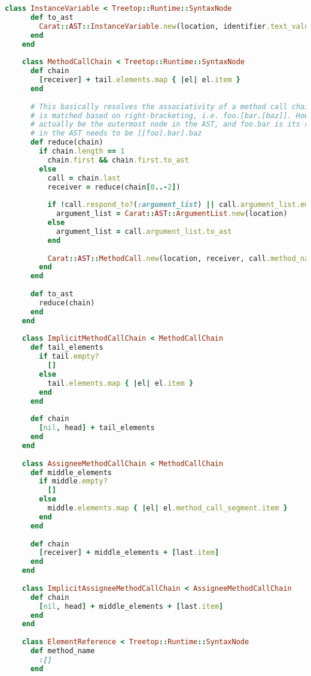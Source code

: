 \begin{lstlisting}[title={\small\Helvetica parser/nodes.rb},language=Ruby]
    class InstanceVariable < Treetop::Runtime::SyntaxNode
      def to_ast
        Carat::AST::InstanceVariable.new(location, identifier.text_value.to_sym)
      end
    end
    
    class MethodCallChain < Treetop::Runtime::SyntaxNode
      def chain
        [receiver] + tail.elements.map { |el| el.item }
      end
      
      # This basically resolves the associativity of a method call chain. During parsing, the chain
      # is matched based on right-bracketing, i.e. foo.[bar.[baz]]. However, the call to baz should
      # actually be the outermost node in the AST, and foo.bar is its receiver. So the bracketing
      # in the AST needs to be [[foo].bar].baz
      def reduce(chain)
        if chain.length == 1
          chain.first && chain.first.to_ast
        else
          call = chain.last
          receiver = reduce(chain[0..-2])
          
          if !call.respond_to?(:argument_list) || call.argument_list.empty?
            argument_list = Carat::AST::ArgumentList.new(location)
          else
            argument_list = call.argument_list.to_ast
          end
          
          Carat::AST::MethodCall.new(location, receiver, call.method_name.to_sym, argument_list)
        end
      end
      
      def to_ast
        reduce(chain)
      end
    end
    
    class ImplicitMethodCallChain < MethodCallChain
      def tail_elements
        if tail.empty?
          []
        else
          tail.elements.map { |el| el.item }
        end
      end
    
      def chain
        [nil, head] + tail_elements
      end
    end
    
    class AssigneeMethodCallChain < MethodCallChain
      def middle_elements
        if middle.empty?
          []
        else
          middle.elements.map { |el| el.method_call_segment.item }
        end
      end
      
      def chain
        [receiver] + middle_elements + [last.item]
      end
    end
    
    class ImplicitAssigneeMethodCallChain < AssigneeMethodCallChain
      def chain
        [nil, head] + middle_elements + [last.item]
      end
    end
    
    class ElementReference < Treetop::Runtime::SyntaxNode
      def method_name
        :[]
      end
      

\end{lstlisting}
